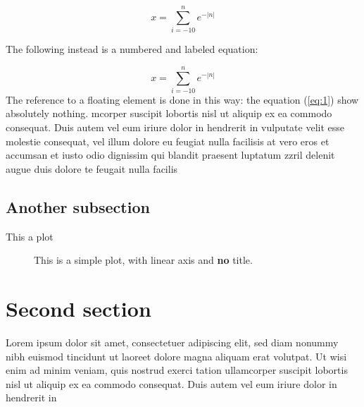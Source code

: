 \documentclass[a4paper, 10pt]{report}
\begin{document}
\[
x = \sum_{i=-10}^n e^{-|n|}
\]


The following instead is a numbered and labeled equation:

\begin{equation}
\label{eq:1}
x = \sum_{i=-10}^n e^{-|n|}
\end{equation}
The reference to a floating element is done in this way: the equation (\ref{eq:1}) show absolutely nothing.
mcorper suscipit lobortis nisl ut aliquip ex ea commodo consequat. Duis autem vel eum iriure dolor in hendrerit in
vulputate velit esse molestie consequat, vel illum dolore eu feugiat nulla facilisis at vero eros et
accumsan et iusto odio dignissim qui blandit praesent luptatum zzril delenit augue duis dolore te feugait nulla facilis


\subsection{Another subsection}

This a plot

\begin{figure}[ht!]
\begin{center}


\caption{This is a simple plot, with linear axis and {\bf no} title.}
\label{fig:plot}
\end{center}
\end{figure}

\section{Second section}

Lorem ipsum
dolor sit amet, consectetuer adipiscing elit, sed diam nonummy nibh euismod tincidunt ut
laoreet dolore magna aliquam erat volutpat. Ut wisi enim ad minim veniam, quis nostrud exerci tation
ullamcorper suscipit lobortis nisl ut aliquip ex ea commodo consequat. Duis autem vel eum iriure dolor in hendrerit in
\end{document}
